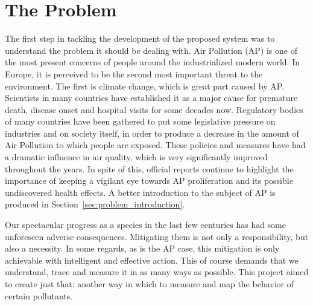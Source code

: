 \section{The Problem}%
\label{sec:the_problem}

The first step in tackling the development of the proposed system was to
understand the problem it should be dealing with. Air Pollution
(\gls{AP}) is one of the most present concerns of people around the
industrialized modern world. In Europe, it is perceived to be the second
most important threat to the environment. The first is climate change,
which is great part caused by \gls{AP}. Scientists in many countries
have established it as a major cause for premature death, disease onset
and hospital visits for some decades now. Regulatory bodies of many
countries have been gathered to put some legislative pressure on
industries and on society itself, in order to produce a decrease in the
amount of Air Pollution to which people are exposed. These policies and
measures have had a dramatic influence in air quality, which is very
significantly improved throughout the years. In spite of this, official
reports continue to highlight the importance of keeping a vigilant eye
towards \gls{AP} proliferation and its possible undiscovered health
effects. A better introduction to the subject of \gls{AP} is produced in
Section~\ref{sec:problem_introduction}.

Our spectacular progress as a species in the last few centuries has had
some unforeseen adverse consequences. Mitigating them is not only a
responsibility, but also a necessity. In some regards, as is the
\gls{AP} case, this mitigation is only achievable with intelligent and
effective action. This of course demands that we understand, trace and
measure it in as many ways as possible. This project aimed to create
just that: another way in which to measure and map the behavior of
certain pollutants.



